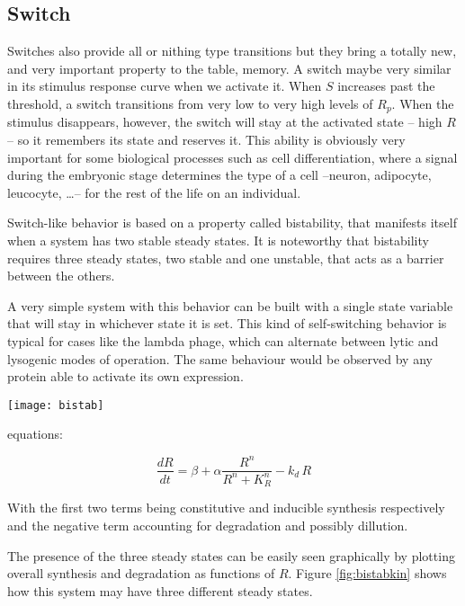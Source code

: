 \subsection{Switch}
Switches also provide all or nithing type transitions but they bring a totally new, and very important property to the table, memory. A switch maybe very similar in its stimulus response curve when we activate it. When $S$ increases  past the threshold, a switch transitions from  very low  to very high levels of $R_p$. When the stimulus disappears, however, the switch will stay at the activated state -- high $R$ -- so it remembers its state and reserves it. This ability is obviously very important for some biological processes such as cell differentiation, where a signal during the embryonic stage determines the type of a cell --neuron, adipocyte, leucocyte, \dots -- for the rest of the life on an individual.

Switch-like behavior is based on a property called bistability, that manifests itself when a system has two stable steady states. It is noteworthy that bistability requires three steady states, two stable and one unstable, that acts as a barrier between the others.

A very simple system with this behavior can be built with a single state variable that will stay in whichever state it is set. This kind of self-switching behavior is typical for cases like the lambda phage, which can alternate between lytic and lysogenic modes of operation. The same behaviour would be observed by any protein able to activate its own expression.

\begin{marginfigure}
	\begin{center}
		\texttt{[image: bistab]}
	\end{center}
	\caption{ ... }
	\label{fig:bistab}
\end{marginfigure}

equations:

\begin{equation}
	\frac{dR}{dt} = \beta + \alpha \frac{R^n}{R^n  + K_R^n} - k_d \, R
\end{equation}

With the first two terms being constitutive and inducible synthesis respectively and the negative term accounting for degradation and possibly dillution.

The presence of the three steady states can be easily seen graphically by plotting overall synthesis and degradation as functions of $R$. Figure \ref{fig:bistabkin} shows how this system may have three different steady states.

